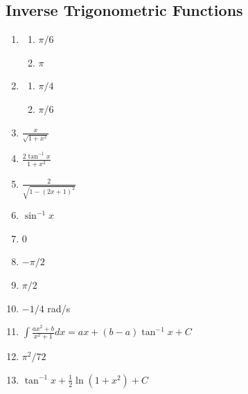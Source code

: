 \documentclass{article} \usepackage[margin=1in]{geometry}
\begin{document}
\subsection{Inverse Trigonometric Functions}
\begin{enumerate}
	\item \begin{enumerate}
		      \item $\pi/6$
		      \item $\pi$
	      \end{enumerate}
	      \setcounter{enumi}{2}
	\item \begin{enumerate}
		      \item $\pi/4$
		      \item $\pi/6$
	      \end{enumerate}
	      \setcounter{enumi}{12}
	\item $\frac{x}{\sqrt{1+x^2}}$
	      \setcounter{enumi}{22}
	\item $\frac{2\tan^{-1}x}{1+x^2}$
	      \setcounter{enumi}{24}
	\item $\frac{2}{\sqrt{1-(2x+1)^2}}$
	      \setcounter{enumi}{26}
	\item $\sin^{-1}x$
	      \setcounter{enumi}{32}
	\item 0
	      \setcounter{enumi}{42}
	\item $-\pi/2$
	      \setcounter{enumi}{44}
	\item $\pi/2$
	      \setcounter{enumi}{48}
	\item $-1/4$ rad/s
	      \setcounter{enumi}{56}
	\item $\int{\frac{ax^2+b}{x^2+1}dx}=ax+(b-a)\tan^{-1}x+C$
	      \setcounter{enumi}{60}
	\item $\pi^2/72$
	      \setcounter{enumi}{62}
	\item $\tan^{-1}x+\frac{1}{2}\ln(1+x^2)+C$
\end{enumerate}
\end{document}
